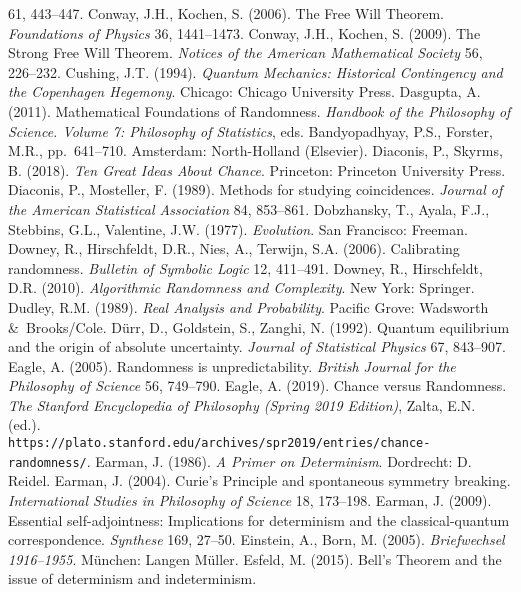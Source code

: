 \documentclass[11pt,a4paper]{article}
\numberwithin{equation}{section}
\begin{document}
\begin{small}
\begin{thebibliography}{99}
 61, 443--447.
   \bibitem{}
 Conway, J.H., Kochen, S. (2006). The Free Will Theorem. \emph{Foundations of Physics}
 36, 1441--1473.
\bibitem{} Conway, J.H., Kochen, S. (2009).
The Strong Free Will Theorem.
 \emph{Notices of the American Mathematical Society} 56, 226--232.
 \bibitem{} Cushing, J.T. (1994). 
 \emph{Quantum Mechanics: Historical Contingency and the Copenhagen Hegemony}. Chicago: Chicago University Press.  
\bibitem{} Dasgupta, A. (2011). Mathematical Foundations of Randomness. \emph{Handbook of the Philosophy of Science. Volume 7: Philosophy of Statistics}, eds. Bandyopadhyay, P.S., Forster, M.R., pp.\ 641--710. Amsterdam: North-Holland (Elsevier).
\bibitem{} Diaconis, P., Skyrms, B. (2018). \emph{Ten Great Ideas About Chance}. Princeton: Princeton University Press.  
\bibitem{} 
 Diaconis, P., Mosteller, F. (1989). Methods for studying coincidences. \emph{Journal of the American Statistical Association} 84, 853--861.
\bibitem{}  Dobzhansky, T., Ayala, F.J., Stebbins, G.L., Valentine, J.W. (1977). \emph{Evolution}. San Francisco: Freeman.  
\bibitem{} Downey, R.,  Hirschfeldt, D.R., Nies, A., Terwijn, S.A. (2006). 
Calibrating randomness. \emph{Bulletin of Symbolic Logic} 12, 411--491. 
\bibitem{} Downey, R.,  Hirschfeldt,  D.R. (2010). \emph{Algorithmic Randomness and Complexity}. New York: Springer. 
\bibitem{}Dudley, R.M. (1989). \emph{Real Analysis and Probability}. Pacific Grove: Wadsworth \&\ Brooks/Cole.
\bibitem{} D\"{u}rr, D., Goldstein, S., Zanghi, N. (1992). Quantum equilibrium and the origin of absolute uncertainty.
\emph{Journal of Statistical Physics} 67, 843--907. 
\bibitem{} Eagle, A. (2005). Randomness is unpredictability. \emph{British Journal for the Philosophy of Science} 56, 749--790. 
\bibitem{} Eagle, A. (2019).  Chance versus Randomness. \emph{The Stanford Encyclopedia of Philosophy (Spring 2019 Edition)}, Zalta, E.N.  (ed.). \\ \verb#https://plato.stanford.edu/archives/spr2019/entries/chance-randomness/#.
\bibitem{} Earman, J. (1986).  \emph{A Primer on Determinism}. Dordrecht: D. Reidel. 
\bibitem{} Earman, J. (2004). Curie's Principle and spontaneous symmetry breaking. \emph{International Studies in  Philosophy of Science} 18, 173--198. 
\bibitem{} Earman, J. (2009). Essential self-adjointness: Implications for determinism and the classical-quantum correspondence.
\emph{Synthese} 169, 27--50. 
\bibitem{}  Einstein, A., Born, M. (2005). \emph{Briefwechsel 1916--1955}. M\"{u}nchen: Langen M\"{u}ller.
\bibitem{}  Esfeld, M. (2015). Bell's Theorem and the issue of determinism and indeterminism.

\end{thebibliography}
\end{small}
\end{document}
